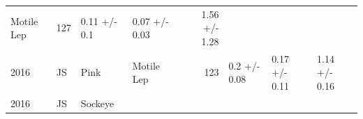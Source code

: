\documentclass[fleqn,10pt]{wlpeerj} %
\begin{document}
\begin{longtable}[]{@{}llllrlll@{}}
\begin{minipage}[t]{0.11\columnwidth}
Motile Lep\strut
\end{minipage} & \begin{minipage}[t]{0.04\columnwidth}\raggedleft\strut
127\strut
\end{minipage} & \begin{minipage}[t]{0.14\columnwidth}\raggedright\strut
0.11 +/- 0.1\strut
\end{minipage} & \begin{minipage}[t]{0.14\columnwidth}\raggedright\strut
0.07 +/- 0.03\strut
\end{minipage} & \begin{minipage}[t]{0.14\columnwidth}\raggedright\strut
1.56 +/- 1.28\strut
\end{minipage}\tabularnewline
\begin{minipage}[t]{0.09\columnwidth}\raggedright\strut
2016\strut
\end{minipage} & \begin{minipage}[t]{0.06\columnwidth}\raggedright\strut
JS\strut
\end{minipage} & \begin{minipage}[t]{0.06\columnwidth}\raggedright\strut
Pink\strut
\end{minipage} & \begin{minipage}[t]{0.11\columnwidth}\raggedright\strut
Motile Lep\strut
\end{minipage} & \begin{minipage}[t]{0.04\columnwidth}\raggedleft\strut
123\strut
\end{minipage} & \begin{minipage}[t]{0.14\columnwidth}\raggedright\strut
0.2 +/- 0.08\strut
\end{minipage} & \begin{minipage}[t]{0.14\columnwidth}\raggedright\strut
0.17 +/- 0.11\strut
\end{minipage} & \begin{minipage}[t]{0.14\columnwidth}\raggedright\strut
1.14 +/- 0.16\strut
\end{minipage}\tabularnewline
\begin{minipage}[t]{0.09\columnwidth}\raggedright\strut
2016\strut
\end{minipage} & \begin{minipage}[t]{0.06\columnwidth}\raggedright\strut
JS\strut
\end{minipage} & \begin{minipage}[t]{0.06\columnwidth}\raggedright\strut
Sockeye\strut
\end{minipage} & \begin{minipage}[t]{0.11\columnwidth}\raggedright\strut

\end{minipage}
\end{longtable}
\end{document}
